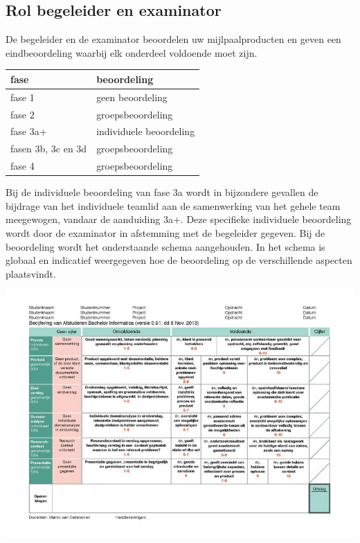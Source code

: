 \subsection{Rol begeleider en examinator}
De begeleider en de examinator beoordelen uw mijlpaalproducten en geven een
eindbeoordeling waarbij elk onderdeel voldoende moet zijn.

\begin{center}
\begin{tabular}{ll}
\hline
{\bf fase} 		& {\bf beoordeling}\\\hline
fase 1 			& geen beoordeling\\
fase 2 			& groepsbeoordeling\\
fase 3a+ 		& individuele beoordeling\\
fasen 3b, 3c en 3d 	& groepsbeoordeling\\
fase 4   		& groepsbeoordeling\\
\hline
\end{tabular}
\end{center}


Bij de individuele beoordeling van fase 3a wordt in bijzondere gevallen de
bijdrage van het individuele teamlid aan de samenwerking van het gehele team
meegewogen, vandaar de aanduiding 3a+. Deze specifieke individuele beoordeling
wordt door de examinator in afstemming met de begeleider gegeven. Bij
de beoordeling wordt het onderstaande schema aangehouden. In het schema is
globaal en indicatief weergegeven hoe de beoordeling op de verschillende
aspecten plaatsvindt.

\includegraphics[width=17cm]{voorbeeld-ABI-cijfer}

